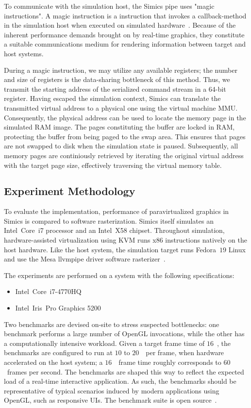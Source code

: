 To communicate with the simulation host, the Simics pipe uses "magic instructions".
A magic instruction is a  instruction that invokes a callback-method in the simulation host when executed on simulated hardware~.
Because of the inherent performance demands brought on by real-time graphics, they constitute a suitable communications medium for rendering information between target and host systems.

During a magic instruction, we may utilize any available registers; the number and size of registers is the data-sharing bottleneck of this method.
Thus, we transmit the starting address of the serialized command stream in a 64-bit register.
Having escaped the simulation context, Simics can translate the transmitted virtual address to a physical one using the virtual machine MMU.
Consequently, the physical address can be used to locate the memory page in the simulated RAM image.
The pages constituting the buffer are locked in RAM, protecting the buffer from being paged to the swap area.
This ensures that pages are not swapped to disk when the simulation state is paused.
Subsequently, all memory pages are continiously retrieved by iterating the original virtual address with the target page size, effectively traversing the virtual memory table.

\subsection{Experiment Methodology}
\label{sec:experimentmethodology}
To evaluate the implementation, performance of paravirtualized graphics in Simics is compared to software rasterization.
Simics itself simulates an Intel\circledR ~Core\texttrademark ~i7 processor and an Intel\circledR ~X58 chipset.
Throughout simulation, hardware-assisted virtualization using KVM runs x86 instructions natively on the host hardware.
Like the host system, the simulation target runs Fedora~$19$ Linux and use the Mesa llvmpipe driver software rasterizer~.

The experiments are performed on a system with the following specifications:
\begin{itemize}
\item Intel\circledR\ Core\texttrademark\ i7-4770HQ
\item Intel\circledR\ Iris\texttrademark\ Pro Graphics 5200
\end{itemize}

Two benchmarks are devised on-site to stress suspected bottlenecks: one benchmark performs a large number of OpenGL invocations, while the other has a computationally intensive workload.
Given a target frame time of $16$~\milli\second , the benchmarks are configured to run at $10$ to $20$~\milli\second\ per frame, when hardware accelerated on the host system; a $16$~\milli\second\ frame time roughly corresponds to $60$~frames per second.
The benchmarks are shaped this way to reflect the expected load of a real-time interactive application.
As such, the benchmarks should be representative of typical scenarios induced by modern applications using OpenGL, such as responsive UIs.
The benchmark suite is open source~.

